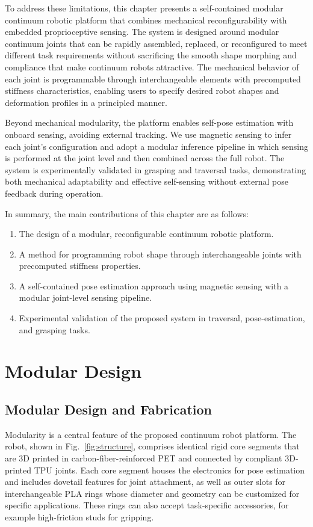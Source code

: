 To address these limitations, this chapter presents a self-contained modular continuum robotic platform that combines mechanical reconfigurability with embedded proprioceptive sensing. The system is designed around modular continuum joints that can be rapidly assembled, replaced, or reconfigured to meet different task requirements without sacrificing the smooth shape morphing and compliance that make continuum robots attractive. The mechanical behavior of each joint is programmable through interchangeable elements with precomputed stiffness characteristics, enabling users to specify desired robot shapes and deformation profiles in a principled manner.

Beyond mechanical modularity, the platform enables self-pose estimation with onboard sensing, avoiding external tracking. We use magnetic sensing to infer each joint's configuration and adopt a modular inference pipeline in which sensing is performed at the joint level and then combined across the full robot. The system is experimentally validated in grasping and traversal tasks, demonstrating both mechanical adaptability and effective self-sensing without external pose feedback during operation.

In summary, the main contributions of this chapter are as follows:
\begin{enumerate}
    \item The design of a modular, reconfigurable continuum robotic platform.
    \item A method for programming robot shape through interchangeable joints with precomputed stiffness properties.
    \item A self-contained pose estimation approach using magnetic sensing with a modular joint-level sensing pipeline.
    \item Experimental validation of the proposed system in traversal, pose-estimation, and grasping tasks.
\end{enumerate}

\section{Modular Design}

\subsection{Modular Design and Fabrication}

Modularity is a central feature of the proposed continuum robot platform. The robot, shown in Fig.~\ref{fig:structure}, comprises identical rigid core segments that are 3D printed in carbon-fiber-reinforced PET and connected by compliant 3D-printed TPU joints. Each core segment houses the electronics for pose estimation and includes dovetail features for joint attachment, as well as outer slots for interchangeable PLA rings whose diameter and geometry can be customized for specific applications. These rings can also accept task-specific accessories, for example high-friction studs for gripping.


